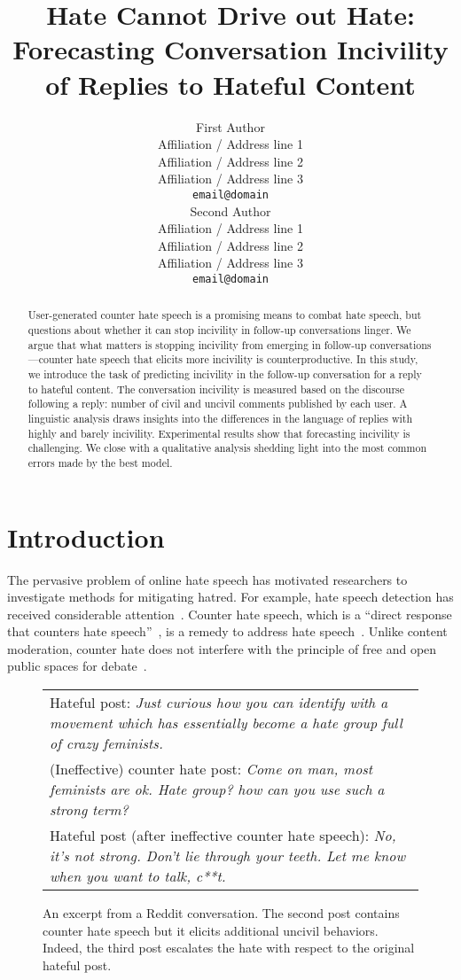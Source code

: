 \documentclass[11pt]{article}
\title{Hate Cannot Drive out Hate:\\Forecasting Conversation Incivility of Replies to Hateful Content}
\author{First Author \\
	Affiliation / Address line 1 \\
	Affiliation / Address line 2 \\
	Affiliation / Address line 3 \\
	\texttt{email@domain} \\\And
	Second Author \\
	Affiliation / Address line 1 \\
	Affiliation / Address line 2 \\
	Affiliation / Address line 3 \\
	\texttt{email@domain} \\}
\begin{document}
	\maketitle
	\begin{abstract}
		User-generated counter hate speech is a promising means to combat hate speech,
		but questions about whether it can stop incivility in follow-up conversations linger.
		We argue that what matters is stopping incivility from emerging in follow-up conversations---counter hate speech that elicits more incivility is counterproductive.
		In this study, we introduce the task of predicting incivility in the follow-up conversation for a reply to hateful content.
		The conversation incivility is measured based on the discourse following a reply: number of civil and uncivil comments published by each user.
		A linguistic analysis draws insights into the differences in the language of replies with highly and barely incivility.
		Experimental results show that forecasting incivility is challenging.
		We close with a qualitative analysis shedding light into the most common errors made by the best model.
	\end{abstract}
	
	\section{Introduction}
	The pervasive problem of online hate speech has motivated
	researchers to investigate methods for mitigating hatred.
	For example, hate speech detection has received considerable attention~\cite{schmidt-wiegand-2017-survey,10.1145/3232676}. 
	Counter hate speech, which is a ``direct response that counters hate speech''~\cite{DBLP:conf/icwsm/MathewSTRSMG019},
	is a remedy to address hate speech~\cite{richards2000counterspeech}. 
	Unlike content moderation,
	counter hate does not interfere with the principle of free and open public spaces for debate~\cite{DBLP:conf/icwsm/MathewSTRSMG019,schieb2016governing,chung-etal-2019-conan}.
	
	\begin{figure}
		\small
		\centering
		\begin{tabular}{@{}p{\columnwidth}@{}}
			\toprule
			Hateful post:
			\emph{Just curious how you can identify with a movement which has essentially become a hate group full of crazy feminists.}  \\ \addlinespace
			(Ineffective) counter hate post:
			\emph{Come on man, most feminists are ok. Hate group? how can you use such a strong term?}  \\ \addlinespace
			Hateful post (after ineffective counter hate speech):
			\emph{No, it’s not strong. Don’t lie through your teeth. Let me know when you want to talk, c**t.} \\ 
			\bottomrule
		\end{tabular}
		\caption{
			An excerpt from a Reddit conversation.
			The second post contains counter hate speech but it elicits additional uncivil behaviors.
			Indeed, the third post escalates the hate with respect to the original hateful post.
		}
		\label{f:problem-example}
	\end{figure}
	
\end{document}
